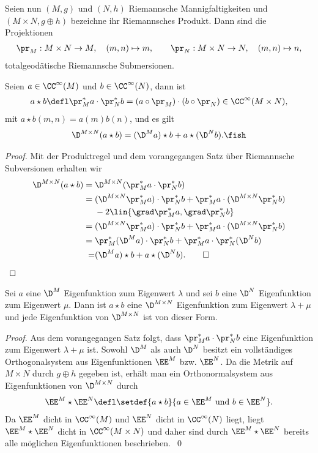 \documentclass[%
	paper=a5,%
	fleqn,%
	DIV=18,%
	BCOR=0mm,
	fontsize=11pt,
	titlepage=false,%
	bibliography=totoc,
	DIV=18,%
	twoside=true,
	pdftitle=Riemannsche Geometrie,
	pdfauthor=Uwe Semmelmann,
	numbers=noendperiod]%
	{scrbook}
\begin{document}
Seien nun $(M,g)$ und $(N,h)$ Riemannsche Mannigfaltigkeiten und $(M\times N,g\oplus h)$ bezeichne ihr Riemannsches Produkt. Dann sind die Projektionen
\begin{align*}
\pr_{M}: M\times N\to M,\quad (m,n)\mapsto m,\qquad
\pr_{N}: M\times N\to N,\quad (m,n)\mapsto n,
\end{align*}
totalgeodätische Riemannsche Submersionen. 

\begin{prop}
Seien $a\in\CC^\infty(M)$ und $b\in\CC^\infty(N)$, dann ist
\begin{align*}
a\star b\defl
\pr_{M}^*a \cdot \pr_{N}^*b = (a\circ\pr_{M})\cdot (b\circ \pr_{N})\in\CC^\infty(M\times N),
\end{align*}
mit $a\star b(m,n) = a(m)b(n)$, und es gilt
\begin{align*}
\D^{M\times N}(a\star b) = 
(\D^M a)\star b + 
a\star (\D^N b).\fish
\end{align*}
\end{prop}
\begin{proof}
Mit der Produktregel und dem vorangegangen Satz über Riemannsche Subversionen erhalten wir
\begin{align*}
\D^{M\times N}(a\star b) = { } &
\D^{M\times N}(\pr_{M}^*a \cdot \pr_{N}^*b)\\ = { } & 
(\D^{M\times N}\pr_{M}^*a)\cdot \pr_{N}^*b + 
\pr_{M}^*a\cdot (\D^{M\times N}\pr_{N}^*b)\\
&-2\lin{\grad \pr_{M}^* a ,\grad \pr_{N}^*b}\\
= { } & 
(\D^{M\times N}\pr_{M}^*a)\cdot \pr_{N}^*b + 
\pr_{M}^*a\cdot (\D^{M\times N}\pr_{N}^*b)\\
= { } & 
\pr_{M}^*(\D^Ma)\cdot \pr_{N}^*b
+
\pr_{M}^* a\cdot \pr_{N}^* (\D^N b)\\
{ } = &
(\D^Ma)\star b
+
a\star (\D^N b).\qed
\end{align*}
\end{proof}

\begin{cor}
Sei $a$ eine $\D^M$ Eigenfunktion zum Eigenwert $\lambda$ und sei $b$ eine $\D^N$ Eigenfunktion zum Eigenwert $\mu$. Dann ist $a\star b$ eine $\D^{M\times N}$ Eigenfunktion zum Eigenwert $\lambda+\mu$ und jede Eigenfunktion von $\D^{M\times N}$ ist von dieser Form.\fish
\end{cor}
\begin{proof}
Aus dem vorangegangen Satz folgt, dass $\pr_{M}^* a\cdot \pr_{N}^* b$ eine Eigenfunktion zum Eigenwert $\lambda+\mu$ ist. 
Sowohl $\D^M$ als auch $\D^N$ besitzt ein vollständiges Orthogonalsystem aus Eigenfunktionen $\EE^M$ bzw. $\EE^N$.
Da die Metrik auf $M\times N$ durch $g\oplus h$ gegeben ist, erhält man ein Orthonormalsystem aus Eigenfunktionen von $\D^{M\times N}$ durch
\begin{align*}
\EE^M\star \EE^N\defl \setdef{a\star b}{a\in \EE^M\text{ und }b\in\EE^N}.
\end{align*}
Da $\EE^M$ dicht in $\CC^\infty(M)$ und $\EE^N$ dicht in $\CC^\infty(N)$ liegt, liegt $\EE^M\star \EE^N$ dicht in $\CC^\infty(M\times N)$ und daher sind durch $\EE^M\star \EE^N$ bereits alle möglichen Eigenfunktionen beschrieben.~\qed
\end{proof}
\end{document}
